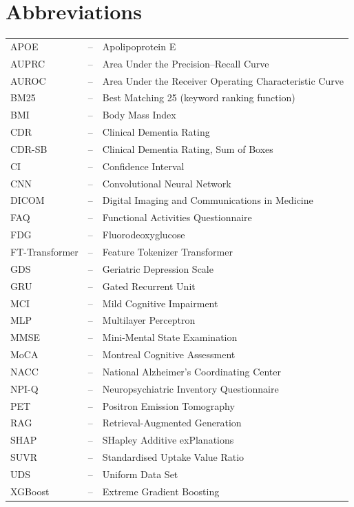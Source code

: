 \chapter*{Abbreviations}
\begin{center}
\begin{tabular}{@{}lcl@{}}
APOE & -- & Apolipoprotein E \\
AUPRC & -- & Area Under the Precision--Recall Curve \\
AUROC & -- & Area Under the Receiver Operating Characteristic Curve \\
BM25 & -- & Best Matching 25 (keyword ranking function) \\
BMI & -- & Body Mass Index \\
CDR & -- & Clinical Dementia Rating \\
CDR-SB & -- & Clinical Dementia Rating, Sum of Boxes \\
CI & -- & Confidence Interval \\
CNN & -- & Convolutional Neural Network \\
DICOM & -- & Digital Imaging and Communications in Medicine \\
FAQ & -- & Functional Activities Questionnaire \\
FDG & -- & Fluorodeoxyglucose \\
FT-Transformer & -- & Feature Tokenizer Transformer \\
GDS & -- & Geriatric Depression Scale \\
GRU & -- & Gated Recurrent Unit \\
MCI & -- & Mild Cognitive Impairment \\
MLP & -- & Multilayer Perceptron \\
MMSE & -- & Mini-Mental State Examination \\
MoCA & -- & Montreal Cognitive Assessment \\
NACC & -- & National Alzheimer's Coordinating Center \\
NPI-Q & -- & Neuropsychiatric Inventory Questionnaire \\
PET & -- & Positron Emission Tomography \\
RAG & -- & Retrieval-Augmented Generation \\
SHAP & -- & SHapley Additive exPlanations \\
SUVR & -- & Standardised Uptake Value Ratio \\
UDS & -- & Uniform Data Set \\
XGBoost & -- & Extreme Gradient Boosting \\
\end{tabular}
\end{center}

